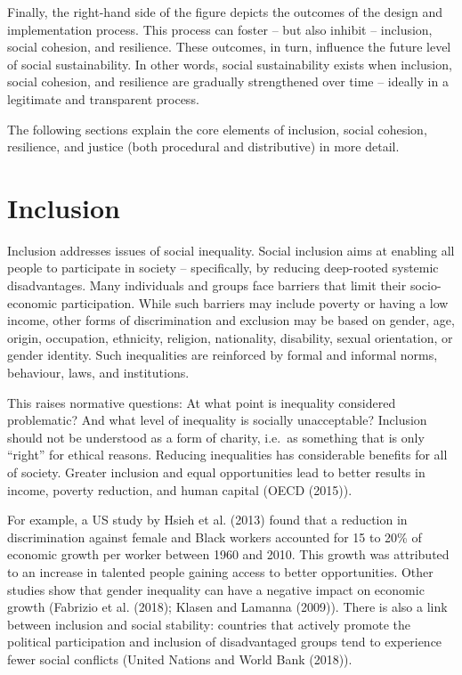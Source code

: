 \documentclass[
  a4paper,
  openany]{book}
\begin{document}
Finally, the right-hand side of the figure depicts the outcomes of the
design and implementation process. This process can foster -- but also
inhibit -- inclusion, social cohesion, and resilience. These outcomes,
in turn, influence the future level of social sustainability. In other
words, social sustainability exists when inclusion, social cohesion, and
resilience are gradually strengthened over time -- ideally in a
legitimate and transparent process.

The following sections explain the core elements of inclusion, social
cohesion, resilience, and justice (both procedural and distributive) in
more detail.

\section{Inclusion}\label{inclusion}

Inclusion addresses issues of social inequality. Social inclusion aims
at enabling all people to participate in society -- specifically, by
reducing deep-rooted systemic disadvantages. Many individuals and groups
face barriers that limit their socio-economic participation. While such
barriers may include poverty or having a low income, other forms of
discrimination and exclusion may be based on gender, age, origin,
occupation, ethnicity, religion, nationality, disability, sexual
orientation, or gender identity. Such inequalities are reinforced by
formal and informal norms, behaviour, laws, and institutions.

This raises normative questions: At what point is inequality considered
problematic? And what level of inequality is socially unacceptable?
Inclusion should not be understood as a form of charity, i.e.~as
something that is only ``right'' for ethical reasons. Reducing
inequalities has considerable benefits for all of society. Greater
inclusion and equal opportunities lead to better results in income,
poverty reduction, and human capital (OECD (2015)).

For example, a US study by Hsieh et al. (2013) found that a reduction in
discrimination against female and Black workers accounted for 15 to 20\%
of economic growth per worker between 1960 and 2010. This growth was
attributed to an increase in talented people gaining access to better
opportunities. Other studies show that gender inequality can have a
negative impact on economic growth (Fabrizio et al. (2018); Klasen and
Lamanna (2009)). There is also a link between inclusion and social
stability: countries that actively promote the political participation
and inclusion of disadvantaged groups tend to experience fewer social
conflicts (United Nations and World Bank (2018)).
\end{document}
